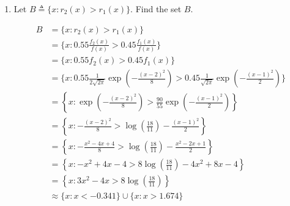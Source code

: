 \documentclass[11pt]{report}
\newcommand{\teq}{\triangleq}
\begin{document}
\begin{enumerate}[1.]
\begin{enumerate}
		      \item Let $B\teq \{x : r_2(x) > r_1(x)\}$. Find the set $B$.

		            \color{blue}
		            \begin{align*}
			            B & = \{x : r_2(x) > r_1(x)\}                                                                                                                      \\
			              & = \{x : 0.55 \frac{f_2(x)}{f(x)} > 0.45 \frac{f_1(x)}{f(x)}\}                                                                                  \\
			              & = \{x : 0.55 f_2(x) > 0.45 f_1(x)\}                                                                                                            \\
			              & = \{x : 0.55 \frac{1}{2\sqrt{2\pi}} \exp\left(-\frac{(x - 2)^2}{8}\right) > 0.45 \frac{1}{\sqrt{2\pi}} \exp\left(-\frac{(x - 1)^2}{2}\right)\} \\
			              & = \left\{x: \exp\left(-\frac{(x - 2)^2}{8}\right) > \frac{90}{55} \exp\left(-\frac{(x - 1)^2}{2}\right)\right\}                                \\
			              & = \left\{x: -\frac{(x - 2)^2}{8} > \log\left(\frac{18}{11}\right) - \frac{(x - 1)^2}{2}\right\}                                                \\
			              & = \left\{x: -\frac{x^2 - 4x + 4}{8} > \log\left(\frac{18}{11}\right) - \frac{x^2 - 2x + 1}{2}\right\}                                          \\
			              & = \left\{x: -x^2 + 4x - 4 > 8\log\left(\frac{18}{11}\right) - 4x^2 + 8x - 4\right\}                                                            \\
			              & = \left\{x: 3x^2 - 4x > 8\log\left(\frac{18}{11}\right)\right\}                                                                                \\
			              & \approx \boxed{\{x: x < -0.341\} \cup \{x: x > 1.674\}}
		            \end{align*}
		            \color{black}
	      \end{enumerate}


	      \pagebreak


\end{enumerate}
\end{document}
